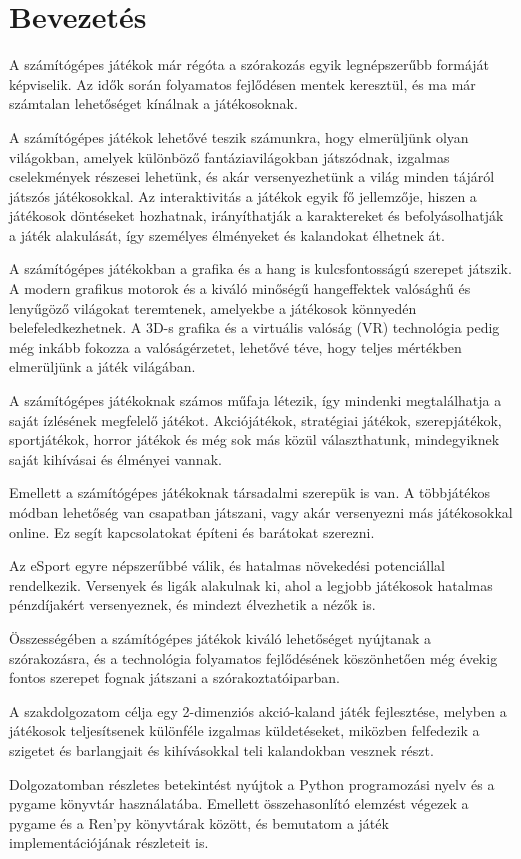 \chapter{Bevezetés}

\indent \indent A számítógépes játékok már régóta a szórakozás egyik legnépszerűbb formáját képviselik. Az idők során folyamatos fejlődésen mentek keresztül, és ma már számtalan lehetőséget kínálnak a játékosoknak.

A számítógépes játékok lehetővé teszik számunkra, hogy elmerüljünk olyan világokban, amelyek különböző fantáziavilágokban játszódnak, izgalmas cselekmények részesei lehetünk, és akár versenyezhetünk a világ minden tájáról játszós játékosokkal. Az interaktivitás a játékok egyik fő jellemzője, hiszen a játékosok döntéseket hozhatnak, irányíthatják a karaktereket és befolyásolhatják a játék alakulását, így személyes élményeket és kalandokat élhetnek át.

A számítógépes játékokban a grafika és a hang is kulcsfontosságú szerepet játszik. A modern grafikus motorok és a kiváló minőségű hangeffektek valósághű és lenyűgöző világokat teremtenek, amelyekbe a játékosok könnyedén belefeledkezhetnek. A 3D-s grafika és a virtuális valóság (VR) technológia pedig még inkább fokozza a valóságérzetet, lehetővé téve, hogy teljes mértékben elmerüljünk a játék világában.

A számítógépes játékoknak számos műfaja létezik, így mindenki megtalálhatja a saját ízlésének megfelelő játékot. Akciójátékok, stratégiai játékok, szerepjátékok, sportjátékok, horror játékok és még sok más közül választhatunk, mindegyiknek saját kihívásai és élményei vannak.

Emellett a számítógépes játékoknak társadalmi szerepük is van. A többjátékos módban lehetőség van csapatban játszani, vagy akár versenyezni más játékosokkal online. Ez segít kapcsolatokat építeni és barátokat szerezni.

Az eSport egyre népszerűbbé válik, és hatalmas növekedési potenciállal rendelkezik. Versenyek és ligák alakulnak ki, ahol a legjobb játékosok hatalmas pénzdíjakért versenyeznek, és mindezt élvezhetik a nézők is.

Összességében a számítógépes játékok kiváló lehetőséget nyújtanak a szórakozásra, és a technológia folyamatos fejlődésének köszönhetően még évekig fontos szerepet fognak játszani a szórakoztatóiparban.

A szakdolgozatom célja egy 2-dimenziós akció-kaland játék fejlesztése, melyben a játékosok teljesítsenek különféle izgalmas küldetéseket, miközben felfedezik a szigetet és barlangjait és kihívásokkal teli kalandokban vesznek részt.

Dolgozatomban részletes betekintést nyújtok a Python programozási nyelv és a pygame könyvtár használatába. Emellett összehasonlító elemzést végezek a pygame és a Ren'py könyvtárak között, és bemutatom a játék implementációjának részleteit is.